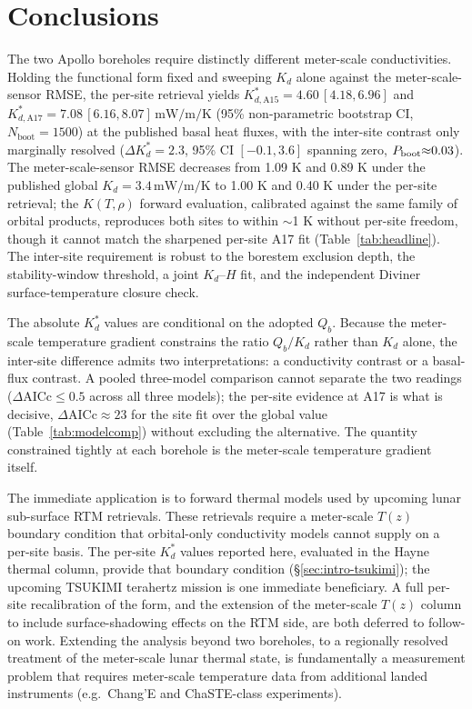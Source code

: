 \documentclass[11pt]{article}
\begin{document}
\FloatBarrier
\section{Conclusions}\label{sec:conclusions}

The two Apollo boreholes require distinctly different
meter-scale conductivities. Holding the \citet{hayne2017}
functional form fixed and sweeping $K_d$ alone against the
meter-scale-sensor RMSE, the per-site retrieval
yields
$K_{d,\mathrm{A15}}^{*}=4.60\,[4.18,6.96]$ and
$K_{d,\mathrm{A17}}^{*}=7.08\,[6.16,8.07]\,\si{\milli\watt\per\meter\per\kelvin}$
(95\% non-parametric bootstrap CI, $N_\mathrm{boot}=1500$) at the
published basal heat fluxes, with the inter-site contrast
only marginally resolved ($\Delta K_d^{*}=2.3$, 95\% CI
$[-0.1,3.6]$ spanning zero, $P_{\rm boot}{\approx}0.03$). The
meter-scale-sensor RMSE decreases from
1.09 K and 0.89 K under the published global
$K_d=3.4\,\si{\milli\watt\per\meter\per\kelvin}$ to 1.00 K and 0.40 K under
the per-site retrieval; the \citet{martinez2021} $K(T,\rho)$ forward
evaluation, calibrated against the same family of orbital products,
reproduces both sites to within $\sim$1 K without per-site
freedom, though it cannot match the sharpened per-site A17 fit
(Table~\ref{tab:headline}). The inter-site requirement is robust to the
borestem exclusion depth, the stability-window threshold, a joint
$K_d$--$H$ fit, and the independent Diviner surface-temperature closure
check.

The absolute $K_d^{*}$ values are conditional on the adopted $Q_b$. Because
the meter-scale temperature gradient constrains the ratio
$Q_b/K_d$ rather than $K_d$ alone, the inter-site difference admits two
interpretations: a conductivity contrast or a basal-flux contrast. A pooled
three-model comparison cannot separate the two readings
($\Delta\mathrm{AICc}\le 0.5$ across all three models); the per-site
evidence at A17 is what is decisive,
$\Delta\mathrm{AICc}\approx 23$ for the site fit over the global value
(Table~\ref{tab:modelcomp}) without
excluding the alternative. The quantity constrained tightly at each
borehole is the meter-scale temperature gradient itself.

The immediate application is to forward thermal models used by upcoming
lunar sub-surface RTM retrievals. These retrievals require a
meter-scale $T(z)$ boundary condition that orbital-only
conductivity models cannot supply on a per-site basis. The per-site
$K_d^{*}$ values reported here, evaluated in the Hayne thermal column,
provide that boundary condition (\S\ref{sec:intro-tsukimi}); the upcoming
TSUKIMI terahertz mission \citep{tsukimi2022} is one immediate beneficiary.
A full per-site recalibration of the
\citet{martinez2021} form, and the
extension of the meter-scale $T(z)$ column to include
surface-shadowing effects on the RTM side, are both deferred to follow-on
work. Extending the analysis beyond two boreholes, to a regionally resolved
treatment of the meter-scale lunar thermal state, is
fundamentally a measurement problem that requires
meter-scale temperature data from additional
landed instruments (e.g.\ Chang'E and ChaSTE-class experiments).
\end{document}
